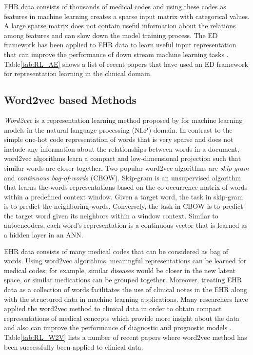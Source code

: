 
EHR data consists of thousands of medical codes and using these codes as features in machine learning creates a sparse input matrix with categorical values. A large sparse matrix does not contain useful information about the relations among features and can slow down the model training process. The ED framework has been applied to EHR data to learn useful input representation that can improve the performance of down stream machine learning tasks \cite{Weng2019}. Table\ref{tab:RL_AE} shows a list of recent papers that have used an ED framework for representation learning in the clinical domain.



\subsection{Word2vec based Methods}
\textit{Word2vec} is a representation learning method proposed by \cite{mikolov2013efficient} for machine learning models in the natural language processing (NLP) domain. In contrast to the simple one-hot code representation of words that is very sparse and does not include any information about the relationships between words in a document, word2vec algorithms learn a compact and low-dimensional projection such that similar words are closer together. Two popular word2vec algorithms are \textit{skip-gram} and \textit{continuous bag-of-words} (CBOW). Skip-gram is an unsupervised algorithm that learns the words representations based on the co-occurrence matrix of words within a predefined context window. Given a target word, the task in skip-gram is to predict the neighboring words. Conversely, the task in CBOW is to predict the target word given its neighbors within a window context. Similar to autoencoders, each word's representation is a continuous vector that is learned as a hidden layer in an ANN.

EHR data consists of many medical codes that can be considered as bag of words. Using word2vec algorithms, meaningful representations can be learned for medical codes; for example, similar diseases would be closer in the new latent space, or similar medications can be grouped together. Moreover, treating EHR data as a collection of words facilitates the use of clinical notes in the EHR along with the structured data in machine learning applications. Many researchers have applied the word2vec method to clinical data in order to obtain compact representations of medical concepts which provide more insight about the data and also can improve the performance of diagnostic and prognostic models \cite{Weng2019}. Table\ref{tab:RL_W2V} lists a number of recent papers where word2vec method has been successfully been applied to clinical data.

